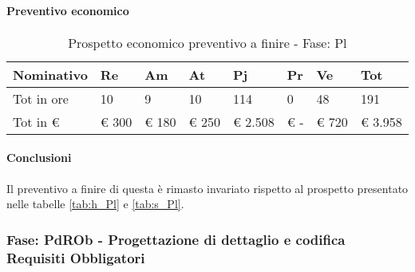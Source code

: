 			\paragraph{Preventivo economico}
							\begin{table}[H] \begin{center} \begin{tabular}{llllllll}
							\toprule
							\textbf{Nominativo}	&	\textbf{Re}	&	\textbf{Am}	&	\textbf{At}	&	\textbf{Pj}	&	\textbf{Pr}	&	\textbf{Ve}	&	\textbf{Tot}	 \\

							\midrule
							Tot in ore	&	10	&	9	&	10	&	114	&	0	&	48	&	191	 \\


							Tot in €	&	 €     300 	 & 	 €      180 	 & 	 €     250 	 & 	 €  2.508 	 & 	 €        -   	 & 	 €     720 	 & 	 €     3.958 	 \\
							\bottomrule
							\end{tabular} \end{center} \caption{Prospetto economico preventivo a finire - Fase:
							Pl
							} \end{table}


			\paragraph{Conclusioni} Il preventivo a finire di questa  è rimasto invariato rispetto al prospetto presentato nelle tabelle \ref{tab:h_Pl} e \ref{tab:s_Pl}.
		\newpage
		\subsubsection {Fase: PdROb - Progettazione di dettaglio e codifica Requisiti Obbligatori}
